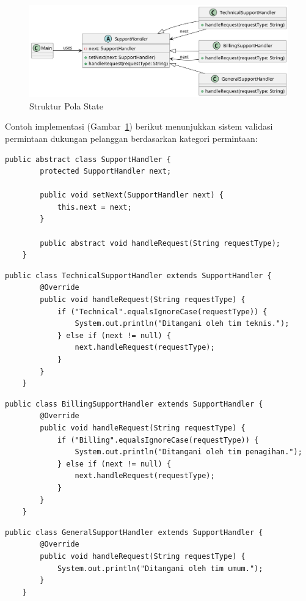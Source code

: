 \begin{figure}[h]
	\centering
	\includegraphics[width=\textwidth]{../figures/out/chain_of_responsibility.png}
	\caption{Struktur Pola State}
	\label{fig:chain_of_responsibility}
\end{figure}

Contoh implementasi (Gambar~\ref{fig:chain_of_responsibility}) berikut menunjukkan sistem validasi permintaan dukungan pelanggan berdasarkan kategori permintaan:



\begin{lstlisting}[style=JavaStyle, caption={Antarmuka Handler}]
	public abstract class SupportHandler {
		protected SupportHandler next;
		
		public void setNext(SupportHandler next) {
			this.next = next;
		}
		
		public abstract void handleRequest(String requestType);
	}
\end{lstlisting}

\begin{lstlisting}[style=JavaStyle, caption={Handler untuk Permintaan Teknis}]
	public class TechnicalSupportHandler extends SupportHandler {
		@Override
		public void handleRequest(String requestType) {
			if ("Technical".equalsIgnoreCase(requestType)) {
				System.out.println("Ditangani oleh tim teknis.");
			} else if (next != null) {
				next.handleRequest(requestType);
			}
		}
	}
\end{lstlisting}

\begin{lstlisting}[style=JavaStyle, caption={Handler untuk Permintaan Penagihan}]
	public class BillingSupportHandler extends SupportHandler {
		@Override
		public void handleRequest(String requestType) {
			if ("Billing".equalsIgnoreCase(requestType)) {
				System.out.println("Ditangani oleh tim penagihan.");
			} else if (next != null) {
				next.handleRequest(requestType);
			}
		}
	}
\end{lstlisting}

\begin{lstlisting}[style=JavaStyle, caption={Handler Default}]
	public class GeneralSupportHandler extends SupportHandler {
		@Override
		public void handleRequest(String requestType) {
			System.out.println("Ditangani oleh tim umum.");
		}
	}
\end{lstlisting}

